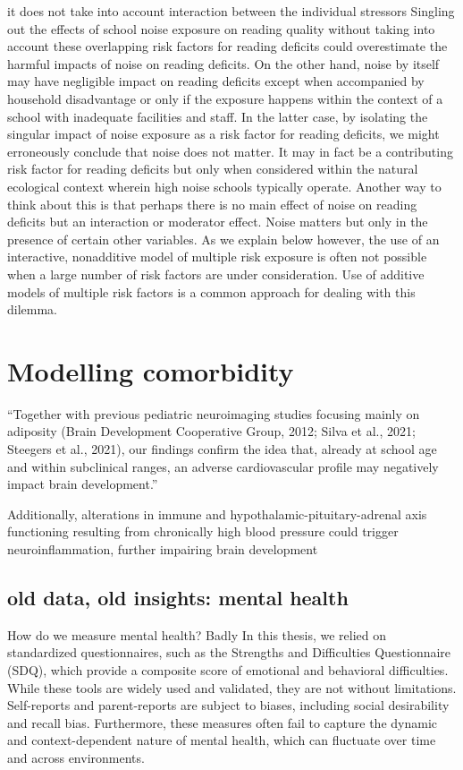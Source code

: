 \documentclass[
  letterpaper,
  DIV=11,
  numbers=noendperiod]{scrreport}
\begin{document}
it does not take into account interaction between the individual
stressors Singling out the effects of school noise exposure on reading
quality without taking into account these overlapping risk factors for
reading deficits could overestimate the harmful impacts of noise on
reading deficits. On the other hand, noise by itself may have negligible
impact on reading deficits except when accompanied by household
disadvantage or only if the exposure happens within the context of a
school with inadequate facilities and staff. In the latter case, by
isolating the singular impact of noise exposure as a risk factor for
reading deficits, we might erroneously conclude that noise does not
matter. It may in fact be a contributing risk factor for reading
deficits but only when considered within the natural ecological context
wherein high noise schools typically operate. Another way to think about
this is that perhaps there is no main effect of noise on reading
deficits but an interaction or moderator effect. Noise matters but only
in the presence of certain other variables. As we explain below however,
the use of an interactive, nonadditive model of multiple risk exposure
is often not possible when a large number of risk factors are under
consideration. Use of additive models of multiple risk factors is a
common approach for dealing with this dilemma.

\section{Modelling comorbidity}\label{modelling-comorbidity}

``Together with previous pediatric neuroimaging studies focusing mainly
on adiposity (Brain Development Cooperative Group, 2012; Silva et al.,
2021; Steegers et al., 2021), our findings confirm the idea that,
already at school age and within subclinical ranges, an adverse
cardiovascular profile may negatively impact brain development.''

Additionally, alterations in immune and hypothalamic-pituitary-adrenal
axis functioning resulting from chronically high blood pressure could
trigger neuroinflammation, further impairing brain development

\subsection{old data, old insights: mental
health}\label{old-data-old-insights-mental-health}

How do we measure mental health? Badly In this thesis, we relied on
standardized questionnaires, such as the Strengths and Difficulties
Questionnaire (SDQ), which provide a composite score of emotional and
behavioral difficulties. While these tools are widely used and
validated, they are not without limitations. Self-reports and
parent-reports are subject to biases, including social desirability and
recall bias. Furthermore, these measures often fail to capture the
dynamic and context-dependent nature of mental health, which can
fluctuate over time and across environments.
\end{document}
